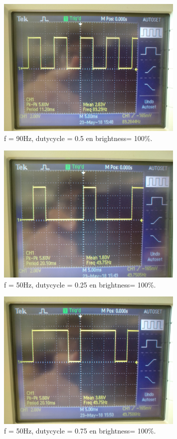 \documentclass[a4paper,dutch]{article}
\begin{document}
\begin{appendices}
\begin{figure}[H]
\centering
\includegraphics[width=0.8\textwidth]{osc-freq-hoog.jpg}
\caption{\label{fig:frhgfso}f = 90Hz, dutycycle = 0.5 en brightness= 100\%.}
\end{figure}

\begin{figure}[h]
\centering
\includegraphics[width=0.8\textwidth]{osc-duty-laag.jpg}
\caption{\label{fig:dula}f = 50Hz, dutycycle = 0.25 en brightness= 100\%.}
\end{figure}

\begin{figure}[H]
\centering
\includegraphics[width=0.8\textwidth]{osc-duty-hoog.jpg}
\caption{\label{fig:fsfdsf}f = 50Hz, dutycycle = 0.75 en brightness= 100\%.}
\end{figure}


\end{appendices}
\end{document}
